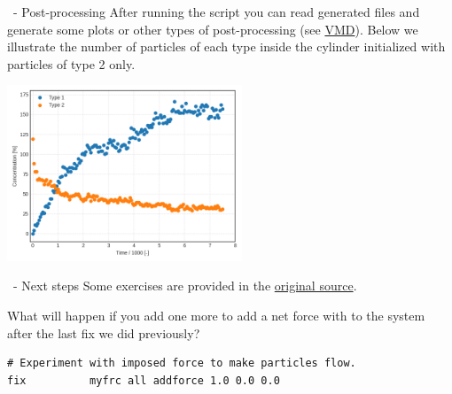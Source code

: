 \begin{frame}[fragile]{\secname}{\subsecname\ - Post-processing}
After running the script you can read generated files and generate some plots or other types of post-processing (see \href{http://www.ks.uiuc.edu/Research/vmd/}{VMD}). Below we illustrate the number of particles of each type inside the cylinder initialized with particles of type 2 only.

\vspace{0.5cm}

{%
\hfill
\includegraphics[width=7cm]{media/003-lennard-jones-concentration-evolution.png}
\hfill
}
\end{frame}

\begin{frame}[fragile]{\secname}{\subsecname\ - Next steps}
Some exercises are provided in the \href{https://lammpstutorials.github.io/tutorials/01-SimpleMolecularSimulation.html}{original source}.

\vspace{0.5cm}

What will happen if you add one more  to add a net force with   to the system after the last fix we did previously?

\vspace{0.5cm}

\begin{lstlisting}[language=LAMMPS,basicstyle=\small]
# Experiment with imposed force to make particles flow.
fix          myfrc all addforce 1.0 0.0 0.0
\end{lstlisting}
\end{frame}

\endinput